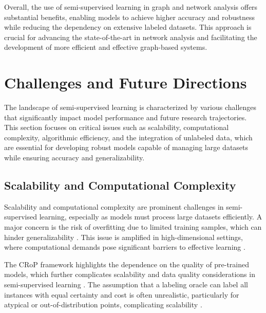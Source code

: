 Overall, the use of semi-supervised learning in graph and network analysis offers substantial benefits, enabling models to achieve higher accuracy and robustness while reducing the dependency on extensive labeled datasets. This approach is crucial for advancing the state-of-the-art in network analysis and facilitating the development of more efficient and effective graph-based systems.












\section{Challenges and Future Directions} \label{sec:Challenges and Future Directions}

The landscape of semi-supervised learning is characterized by various challenges that significantly impact model performance and future research trajectories. This section focuses on critical issues such as scalability, computational complexity, algorithmic efficiency, and the integration of unlabeled data, which are essential for developing robust models capable of managing large datasets while ensuring accuracy and generalizability.


\subsection{Scalability and Computational Complexity} \label{subsec:Scalability and Computational Complexity}

Scalability and computational complexity are prominent challenges in semi-supervised learning, especially as models must process large datasets efficiently. A major concern is the risk of overfitting due to limited training samples, which can hinder generalizability \cite{tumer1999ensemblesradialbasisfunction}. This issue is amplified in high-dimensional settings, where computational demands pose significant barriers to effective learning \cite{williams2018nonpenalizedvariableselectionhighdimensional}.

The CRoP framework highlights the dependence on the quality of pre-trained models, which further complicates scalability and data quality considerations in semi-supervised learning \cite{kaur2024cropcontextwiserobuststatic}. The assumption that a labeling oracle can label all instances with equal certainty and cost is often unrealistic, particularly for atypical or out-of-distribution points, complicating scalability \cite{sen2018supervisingfeatureinfluence}. 

